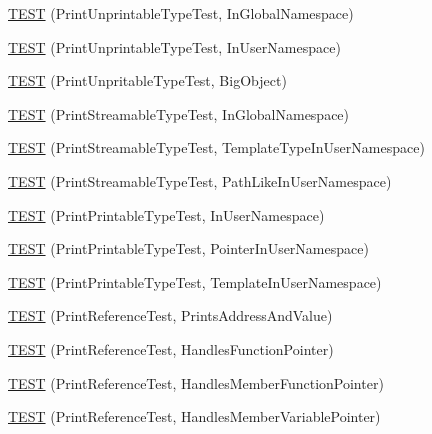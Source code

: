 \begin{DoxyCompactItemize}
\item 
\mbox{\hyperlink{namespacetesting_1_1gtest__printers__test_a805264fd24de8e65cba977a798abc54c}{T\+E\+ST}} (Print\+Unprintable\+Type\+Test, In\+Global\+Namespace)
\item 
\mbox{\hyperlink{namespacetesting_1_1gtest__printers__test_a0aa1499e978bdde6c71e49ecc9db695b}{T\+E\+ST}} (Print\+Unprintable\+Type\+Test, In\+User\+Namespace)
\item 
\mbox{\hyperlink{namespacetesting_1_1gtest__printers__test_a6b6fba2a191094244f8aa78a4933a2c5}{T\+E\+ST}} (Print\+Unpritable\+Type\+Test, Big\+Object)
\item 
\mbox{\hyperlink{namespacetesting_1_1gtest__printers__test_a80fe9d71227a97b12fd5336a823c3d17}{T\+E\+ST}} (Print\+Streamable\+Type\+Test, In\+Global\+Namespace)
\item 
\mbox{\hyperlink{namespacetesting_1_1gtest__printers__test_a8ccd96504d676671a0429073d5012ff1}{T\+E\+ST}} (Print\+Streamable\+Type\+Test, Template\+Type\+In\+User\+Namespace)
\item 
\mbox{\hyperlink{namespacetesting_1_1gtest__printers__test_a243b88c8a03fb501c573c25da302ca98}{T\+E\+ST}} (Print\+Streamable\+Type\+Test, Path\+Like\+In\+User\+Namespace)
\item 
\mbox{\hyperlink{namespacetesting_1_1gtest__printers__test_a52f5df394111bcc55aecc59ce426088d}{T\+E\+ST}} (Print\+Printable\+Type\+Test, In\+User\+Namespace)
\item 
\mbox{\hyperlink{namespacetesting_1_1gtest__printers__test_a3da6191eff6b016540024c2bfccdd90b}{T\+E\+ST}} (Print\+Printable\+Type\+Test, Pointer\+In\+User\+Namespace)
\item 
\mbox{\hyperlink{namespacetesting_1_1gtest__printers__test_aa697a3cf25b7f51f26ab49ed8ac3dd31}{T\+E\+ST}} (Print\+Printable\+Type\+Test, Template\+In\+User\+Namespace)
\item 
\mbox{\hyperlink{namespacetesting_1_1gtest__printers__test_aeae9b61a9fe582c72580db1466631846}{T\+E\+ST}} (Print\+Reference\+Test, Prints\+Address\+And\+Value)
\item 
\mbox{\hyperlink{namespacetesting_1_1gtest__printers__test_aab47074bb60b087e80675a44ad8c88ba}{T\+E\+ST}} (Print\+Reference\+Test, Handles\+Function\+Pointer)
\item 
\mbox{\hyperlink{namespacetesting_1_1gtest__printers__test_a88f9089e0b19be4bda74a953d6a47d7b}{T\+E\+ST}} (Print\+Reference\+Test, Handles\+Member\+Function\+Pointer)
\item 
\mbox{\hyperlink{namespacetesting_1_1gtest__printers__test_af9c63486049ac0ec2a1db65904702eb3}{T\+E\+ST}} (Print\+Reference\+Test, Handles\+Member\+Variable\+Pointer)

\end{DoxyCompactItemize}
